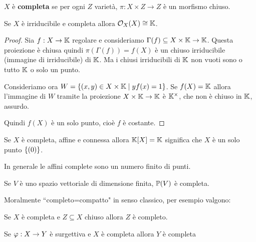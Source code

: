 \begin{definition}
$X$ \`e \textbf{completa} se per ogni $Z$ variet\`a, $\pi:X\times Z\to Z$ \`e un morfismo chiuso.
\end{definition}

\begin{remark}\label{ReRegolariSuCompleteIrriducibiliSonoCostanti}
Se $X$ \`e irriducibile e completa allora $\mathcal{O}_X(X)\cong \mathbb{K}$.
\end{remark}
\begin{proof}
Sia $f:X\to \mathbb{K}$ regolare e consideriamo $\Gamma(f)\subseteq X\times \mathbb{K}\to \mathbb{K}$. Questa proiezione \`e chiusa quindi $\pi(\Gamma(f))=f(X)$ \`e un chiuso irriducibile (immagine di irriducibile) di $\mathbb{K}$. Ma i chiusi irriducibili di $\mathbb{K}$ non vuoti sono o tutto $\mathbb{K}$ o solo un punto.

Consideriamo ora $W=\left\{{(x,y)\in X\times \mathbb{K}\mid yf(x)=1}\right\}$. Se $f(X)=\mathbb{K}$ allora l'immagine di $W$ tramite la proiezione $X\times \mathbb{K}\to \mathbb{K}$ \`e $\mathbb{K}^\times$, che non \`e chiuso in $\mathbb{K}$, assurdo.

Quindi $f(X)$ \`e un solo punto, cio\`e $f$ \`e costante.
\end{proof}
\begin{corollary}
Se $X$ \`e completa, affine e connessa allora $\mathbb{K}[X]=\mathbb{K}$ significa che $X$ \`e un solo punto $\left\{{(0)}\right\}$.

In generale le affini complete sono un numero finito di punti.
\end{corollary}

\begin{theorem}\label{ThProiettiviSonoCompleti}
Se $V$ \`e uno spazio vettoriale di dimensione finita, $\mathbb{P}(V)$ \`e completa.
\end{theorem}

\begin{center}
	Moralmente ``completo=compatto" in senso classico, per esempio valgono:
\end{center}

\begin{remark}
Se $X$ \`e completa e $Z\subseteq X$ chiuso allora $Z$ \`e completo.
\end{remark}

\begin{remark}
Se $\varphi:X\to Y$ \`e surgettiva e $X$ \`e completa allora $Y$ \`e completa
\end{remark}


